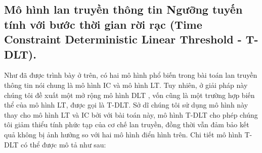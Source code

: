 \subsection{Mô hình lan truyền thông tin Ngưỡng tuyến tính với bước thời gian rời rạc (Time Constraint Deterministic Linear Threshold - T-DLT).}
Như đã được trình bày ở trên, có hai mô hình phổ biến trong bài toán lan truyền thông tin nói chung là mô hình IC và mô hình LT. Tuy nhiên, ở giải pháp này chúng tôi đề xuất một mở rộng mô hình DLT \cite{zaixin}, vốn cũng là một trường hợp biến thể của mô hình LT, được gọi là T-DLT. Sở dĩ chúng tôi sử dụng mô hình này thay cho mô hình LT và IC bởi với bài toán này, mô hình T-DLT cho phép chúng tôi giảm thiểu tính phức tạp của cơ chế lan truyền, đồng thời vẫn đảm bảo kết quả không bị ảnh hưởng so với hai mô hình điển hình trên. Chi tiết mô hình T-DLT có thể được mô tả như sau:
